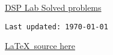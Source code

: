 \documentclass[11pt,a4paper]{article}
\newcommand{\note}[1]{%
	\begin{tcolorbox}[colframe=orange!75!black, title=Note]
		#1
	\end{tcolorbox}
}
\begin{document}
\begin{center}
	{\Huge \normalfont \underline{DSP Lab Solved problems}}
	
	\vspace*{10pt}
	\texttt{Last updated: \today\ \DTMcurrenttime}
	
	\href{https://github.com/roopeshor/tex-works/tree/main/Lab\%20Programs/DSP}{\LaTeX\ source here}
	\vspace*{10pt}
\end{center}
\begin{center}
	{\let\clearpage\relax \tableofcontents}
\end{center}



{}
\setlength{\parindent}{0pt}



\end{document}
